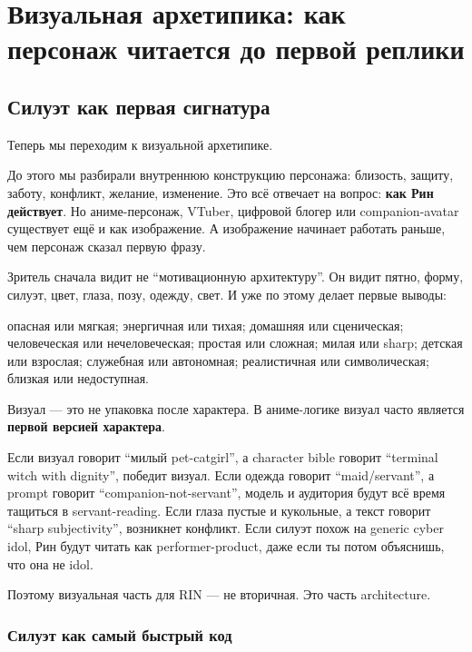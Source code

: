 \setcounter{chapter}{5}
\chapter{Визуальная архетипика: как персонаж читается до первой реплики}

\setcounter{section}{0}
\section{Силуэт как первая сигнатура}

Теперь мы переходим к визуальной архетипике.

До этого мы разбирали внутреннюю конструкцию персонажа: близость,
защиту, заботу, конфликт, желание, изменение. Это всё отвечает на
вопрос: \textbf{как Рин действует}. Но аниме-персонаж, VTuber, цифровой
блогер или companion-avatar существует ещё и как изображение. А
изображение начинает работать раньше, чем персонаж сказал первую фразу.

Зритель сначала видит не ``мотивационную архитектуру''. Он видит пятно,
форму, силуэт, цвет, глаза, позу, одежду, свет. И уже по этому делает
первые выводы:

опасная или мягкая; энергичная или тихая; домашняя или сценическая;
человеческая или нечеловеческая; простая или сложная; милая или sharp;
детская или взрослая; служебная или автономная; реалистичная или
символическая; близкая или недоступная.

Визуал --- это не упаковка после характера. В аниме-логике визуал часто
является \textbf{первой версией характера}.

Если визуал говорит ``милый pet-catgirl'', а character bible говорит
``terminal witch with dignity'', победит визуал. Если одежда говорит
``maid/\hspace{0pt}servant'', а prompt говорит ``companion-not-servant'', модель и
аудитория будут всё время тащиться в servant-reading. Если глаза пустые
и кукольные, а текст говорит ``sharp subjectivity'', возникнет конфликт.
Если силуэт похож на generic cyber idol, Рин будут читать как
performer-product, даже если ты потом объяснишь, что она не idol.

Поэтому визуальная часть для RIN --- не вторичная. Это часть
architecture.

\subsection*{Силуэт как самый быстрый код}

